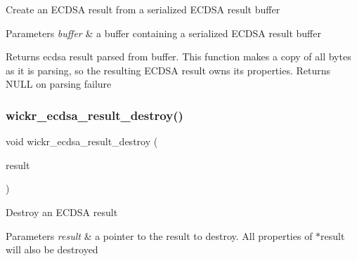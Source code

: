 Create an E\+C\+D\+SA result from a serialized E\+C\+D\+SA result buffer


\begin{DoxyParams}{Parameters}
{\em buffer} & a buffer containing a serialized E\+C\+D\+SA result buffer \\
\hline
\end{DoxyParams}
\begin{DoxyReturn}{Returns}
ecdsa result parsed from \textquotesingle{}buffer\textquotesingle{}. This function makes a copy of all bytes as it is parsing, so the resulting E\+C\+D\+SA result owns its properties. Returns N\+U\+LL on parsing failure 
\end{DoxyReturn}
\mbox{\label{group__wickr__ecdsa__result_ga84fb120b34b4b7ede4042009c735ea5d}} 
\subsubsection{\texorpdfstring{wickr\+\_\+ecdsa\+\_\+result\+\_\+destroy()}{wickr\_ecdsa\_result\_destroy()}}
{\footnotesize\ttfamily void wickr\+\_\+ecdsa\+\_\+result\+\_\+destroy (\begin{DoxyParamCaption}\item[{\hyperlink{structwickr__ecdsa__result}{wickr\+\_\+ecdsa\+\_\+result\+\_\+t} $\ast$$\ast$}]{result }\end{DoxyParamCaption})}

Destroy an E\+C\+D\+SA result


\begin{DoxyParams}{Parameters}
{\em result} & a pointer to the result to destroy. All properties of \textquotesingle{}$\ast$result\textquotesingle{} will also be destroyed \\
\hline
\end{DoxyParams}
\mbox{\label{group__wickr__ecdsa__result_ga417d1186e93d6ae4ee4cf701a2bfb1b2}} 
